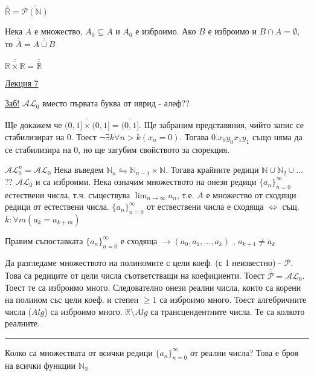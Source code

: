 \documentclass[fleqn, titlepage, 12pt]{report}
\begin{document}
 $ \overline{\overline{\mathbb{R}}} = \overline{\overline{\mathcal{P}(\mathbb{N})}} $
\bigbreak

 Нека $ A $ е множество, $ A_0 \subseteq A $ и $ A_0 $ е изброимо.
Ако $ B $ е изброимо и $ B \cap A = \emptyset $,
то $ \overline{\overline{A}} = \overline{\overline{A \cup B}}  $
\bigbreak

 $ \overline{\overline{\mathbb{R \times R}}} = \overline{\overline{\mathbb{R}}} $
\bigbreak


\begin{center}
  \underline{\huge\normalfont Лекция 7}
\end{center}
\bigbreak

\underline{Заб!} $ \mathcal{AL}_0 $ вместо първата буква от иврид - алеф??
\bigbreak

Ще докажем че $ \overline{\overline{(0,1] \times (0,1]}} = \overline{\overline{(0,1]}} $. Ще забраним представяния, чийто
запис се стабилизират на 0. Тоест $ \lnot \exists{k}\forall{n > k}(x_n = 0) $. Тогава $ 0.x_0 y_0 x_1 y_1 $ също няма
да се стабилизира на 0, но ще загубим свойството за сюрекция.
\bigbreak

$ \mathcal{AL}_0^n = \mathcal{AL}_0 $
Нека въведем $ \mathbb{N}_n \leftrightharpoons \mathbb{N}_{n-1} \times \mathbb{N} $. Тогава крайните редици
$ \mathbb{N} \cup \mathbb{N}_2 \cup ... $ ?? $ \mathcal{AL}_0 $ и са изброими.
\bigbreak
Нека означим множеството на онези редици $ \{a_n\}_{n=0}^\infty $ естествени числа,
т.ч. съществува $ \lim_{n \to \infty} a_n $, т.е. $ A $ е множество от сходящи редици от естествени числа.
\bigbreak
$ \{a_n\}_{n=0}^\infty $ от ествествени числа е сходяща $ \Longleftrightarrow  $
същ. $ k : \forall{m} (a_k = a_{k + m})$
\bigbreak

Правим съпоставката $ \{a_n\}_{n=0}^\infty $ е сходяща $ \rightarrow (a_0, a_1, ..., a_k)$ , $ a_{k+1} \neq a_k $
\bigbreak

Да разгледаме множеството на полиномите с цели коеф. (с 1 неизвестно) - $\mathcal{P}$.
Това са редиците от цели числа съответстващи на коефициенти. Тоест $ \overline{\overline{\mathcal{P}}} = \mathcal{AL}_0 $.
Тоест те са изброимо много. Следователно онези реални числа, които са корени на полином със цели коеф. и степен $ \geq 1 $
са изброимо много. Тоест алгебричните числа ($ Alg  $) са изброимо много.
$ \mathbb{R} \setminus Alg $ са трансцендентните числа. Те са колкото реалните.

\bigbreak
\hrule
\bigbreak

Колко са множествата от всички редици $ \{a_n\}_{n=0}^\infty $ от реални числа? Това е броя на всички функции
$ \mathbb{N}_\mathbb{R}$
\end{document}
